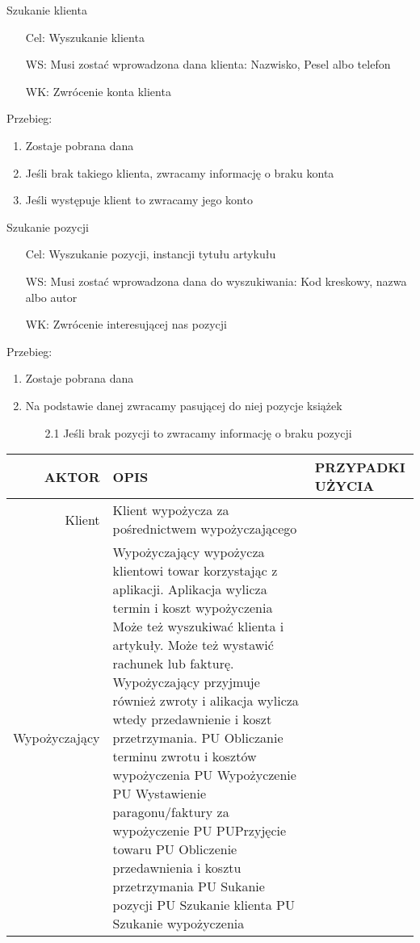 \documentclass{article}
\begin{document}
	\Large	Szukanie klienta\newline
	\normalsize
	\begin{enumerate}
		\item[Cel:] Wyszukanie klienta
		\item[WS:] Musi zostać wprowadzona dana klienta: Nazwisko, Pesel albo telefon
		\item[WK:] Zwrócenie konta klienta
	\end{enumerate}
	
	Przebieg:
	\begin{enumerate}
		\item Zostaje pobrana dana
		\item Jeśli brak takiego klienta, zwracamy informację o braku konta
		\item Jeśli występuje klient to zwracamy jego konto
	\end{enumerate}

		\Large	Szukanie pozycji\newline
		\normalsize
	\begin{enumerate}
		\item[Cel:] Wyszukanie pozycji, instancji tytułu artykułu
		\item[WS:]Musi zostać wprowadzona dana do wyszukiwania: Kod kreskowy, nazwa albo autor
		\item[WK:] Zwrócenie interesującej nas pozycji
	\end{enumerate}
	
	Przebieg:
	\begin{enumerate}
		\item Zostaje pobrana dana
		\item Na podstawie danej zwracamy pasującej do niej pozycje książek
		\begin{enumerate}
			\item [2.1] Jeśli brak pozycji to zwracamy informację o braku pozycji
		\end{enumerate}
	\end{enumerate}

\begin{tabular}{|r|l|l|} \hline 
	AKTOR & OPIS & PRZYPADKI UŻYCIA   \\
	\hline
	Klient & Klient wypożycza za pośrednictwem wypożyczającego &    \\
	\hline
	Wypożyczający & Wypożyczający wypożycza klientowi towar korzystając z aplikacji.  Aplikacja wylicza termin i koszt wypożyczenia Może też wyszukiwać klienta i artykuły. Może też wystawić rachunek lub fakturę. Wypożyczający przyjmuje również zwroty i alikacja wylicza wtedy przedawnienie i koszt przetrzymania. 
	PU Obliczanie terminu zwrotu i kosztów wypożyczenia 
	PU Wypożyczenie 
	PU Wystawienie paragonu/faktury za wypożyczenie 
	PU PUPrzyjęcie towaru
	PU Obliczenie przedawnienia i kosztu przetrzymania
	PU Sukanie pozycji
	PU Szukanie klienta
	PU Szukanie wypożyczenia \\
	\hline 
\end{tabular}
\end{document}
